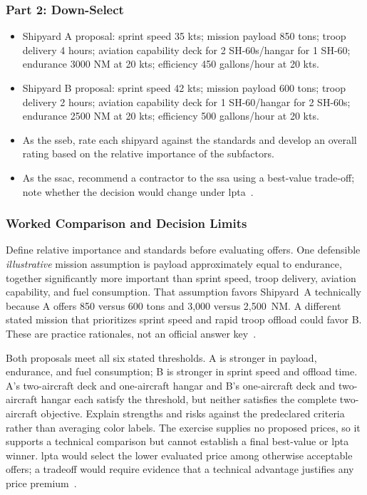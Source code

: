 \documentclass[../main.tex]{subfiles}
\begin{document}
\subsubsection{Part 2: Down-Select}
\begin{itemize}
  \item Shipyard A proposal: sprint speed 35 kts; mission payload 850 tons; troop delivery 4 hours; aviation capability deck for 2 SH-60s/hangar for 1 SH-60; endurance 3000 NM at 20 kts; efficiency 450 gallons/hour at 20 kts.
  \item Shipyard B proposal: sprint speed 42 kts; mission payload 600 tons; troop delivery 2 hours; aviation capability deck for 1 SH-60/hangar for 2 SH-60s; endurance 2500 NM at 20 kts; efficiency 500 gallons/hour at 20 kts.
  \item As the \ac{sseb}, rate each shipyard against the standards and develop an overall rating based on the relative importance of the subfactors.
  \item As the \ac{ssac}, recommend a contractor to the \ac{ssa} using a best-value trade-off; note whether the decision would change under \ac{lpta}~\autocite{edo-3-2-5-source-selection-practical-2025}.
\end{itemize}

\subsubsection{Worked Comparison and Decision Limits}
Define relative importance and standards before evaluating offers. One defensible \emph{illustrative} mission assumption is payload approximately equal to endurance, together significantly more important than sprint speed, troop delivery, aviation capability, and fuel consumption. That assumption favors Shipyard~A technically because A offers 850 versus 600 tons and 3,000 versus 2,500~NM. A different stated mission that prioritizes sprint speed and rapid troop offload could favor B. These are practice rationales, not an official answer key~\autocite{edo-3-2-5-source-selection-practical-2025}.

Both proposals meet all six stated thresholds. A is stronger in payload, endurance, and fuel consumption; B is stronger in sprint speed and offload time. A's two-aircraft deck and one-aircraft hangar and B's one-aircraft deck and two-aircraft hangar each satisfy the threshold, but neither satisfies the complete two-aircraft objective. Explain strengths and risks against the predeclared criteria rather than averaging color labels. The exercise supplies no proposed prices, so it supports a technical comparison but cannot establish a final best-value or \ac{lpta} winner. \ac{lpta} would select the lower evaluated price among otherwise acceptable offers; a tradeoff would require evidence that a technical advantage justifies any price premium~\autocite{edo-3-2-5-source-selection-practical-2025}.
\end{document}
